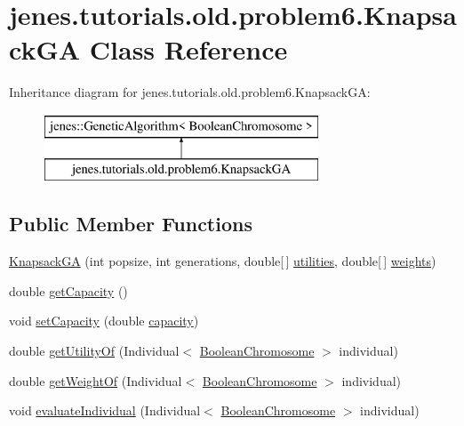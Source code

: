\hypertarget{classjenes_1_1tutorials_1_1old_1_1problem6_1_1_knapsack_g_a}{\section{jenes.\-tutorials.\-old.\-problem6.\-Knapsack\-G\-A Class Reference}
\label{classjenes_1_1tutorials_1_1old_1_1problem6_1_1_knapsack_g_a}
}
Inheritance diagram for jenes.\-tutorials.\-old.\-problem6.\-Knapsack\-G\-A\-:\begin{figure}[H]
\begin{center}
\leavevmode
\includegraphics[height=2.000000cm]{classjenes_1_1tutorials_1_1old_1_1problem6_1_1_knapsack_g_a}
\end{center}
\end{figure}
\subsection*{Public Member Functions}
\begin{DoxyCompactItemize}
\item 
\hyperlink{classjenes_1_1tutorials_1_1old_1_1problem6_1_1_knapsack_g_a_a422824d96285c3b2f61c4fc7b827740b}{Knapsack\-G\-A} (int popsize, int generations, double\mbox{[}$\,$\mbox{]} \hyperlink{classjenes_1_1tutorials_1_1old_1_1problem6_1_1_knapsack_g_a_a1e296b3ed7d413031000777f8a777a5f}{utilities}, double\mbox{[}$\,$\mbox{]} \hyperlink{classjenes_1_1tutorials_1_1old_1_1problem6_1_1_knapsack_g_a_a4ea35cb1fea0197096c91b2f225cd84a}{weights})
\item 
double \hyperlink{classjenes_1_1tutorials_1_1old_1_1problem6_1_1_knapsack_g_a_ad781c31a74a81403fed4c9d366debd39}{get\-Capacity} ()
\item 
void \hyperlink{classjenes_1_1tutorials_1_1old_1_1problem6_1_1_knapsack_g_a_a48beb6d0837db170693758d40fa3fcd0}{set\-Capacity} (double \hyperlink{classjenes_1_1tutorials_1_1old_1_1problem6_1_1_knapsack_g_a_ab8ad295d0154ad8ea6dfd8a70aa97325}{capacity})
\item 
double \hyperlink{classjenes_1_1tutorials_1_1old_1_1problem6_1_1_knapsack_g_a_a1afed02357ac8bd62bf23b34132a1c30}{get\-Utility\-Of} (Individual$<$ \hyperlink{classjenes_1_1chromosome_1_1_boolean_chromosome}{Boolean\-Chromosome} $>$ individual)
\item 
double \hyperlink{classjenes_1_1tutorials_1_1old_1_1problem6_1_1_knapsack_g_a_a3fad8fde8f1c75f2f39665b872578551}{get\-Weight\-Of} (Individual$<$ \hyperlink{classjenes_1_1chromosome_1_1_boolean_chromosome}{Boolean\-Chromosome} $>$ individual)
\item 
void \hyperlink{classjenes_1_1tutorials_1_1old_1_1problem6_1_1_knapsack_g_a_a4a5ada923a1c65269c5cea2431865df5}{evaluate\-Individual} (Individual$<$ \hyperlink{classjenes_1_1chromosome_1_1_boolean_chromosome}{Boolean\-Chromosome} $>$ individual)
\end{DoxyCompactItemize}
